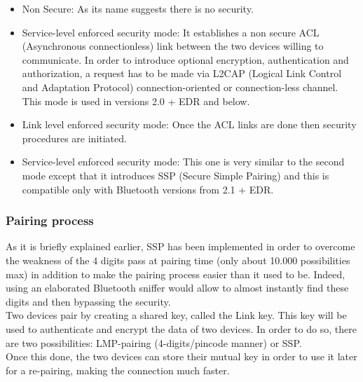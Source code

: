   \begin{itemize}
  	\item Non Secure: As its name suggests there is no security.
  	\item Service-level enforced security mode: It establishes a non secure ACL (Asynchronous connectionless) link between the two devices willing to communicate. In order to introduce optional encryption, authentication and authorization, a request has to be made via L2CAP (Logical Link Control and Adaptation Protocol) connection-oriented or connection-less channel. This mode is used in versions 2.0 + EDR and below.
  	\item Link level enforced security mode: Once the ACL links are done then security procedures are initiated.
  	\item Service-level enforced security mode: This one is very similar to the second mode except that it introduces SSP (Secure Simple Pairing) and this is compatible only with Bluetooth versions from 2.1 + EDR.\\
  \end{itemize}

\subsubsection{Pairing process}

As it is briefly explained earlier, SSP has been implemented in order to overcome the weakness of the 4 digits pass at pairing time (only about 10.000 possibilities max) in addition to make the pairing process easier than it used to be. Indeed, using an elaborated Bluetooth sniffer would allow to almost instantly find these digits and then bypassing the security.\\
	
Two devices pair by creating a shared key, called the Link key. This key will be used to authenticate and encrypt the data of two devices.
In order to do so, there are two possibilities: LMP-pairing (4-digits/pincode manner) or SSP. \\
Once this done, the two devices can store their mutual key in order to use it later for a re-pairing, making the connection much faster.\\

